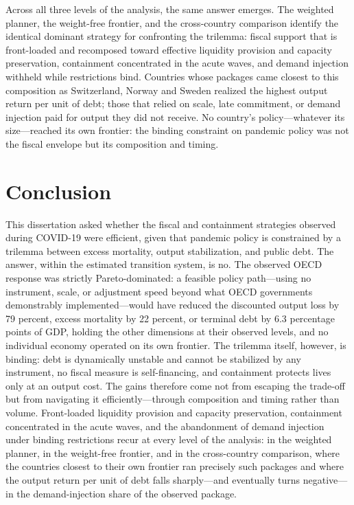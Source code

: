 \documentclass[12pt, a4paper]{article}
\begin{document}
Across all three levels of the analysis, the same answer emerges. The
weighted planner, the weight-free frontier, and the cross-country comparison
identify the identical dominant strategy for confronting the trilemma:
fiscal support that is front-loaded and recomposed toward effective
liquidity provision and capacity preservation, containment concentrated in the acute waves, and demand injection withheld while restrictions bind. Countries whose packages came
closest to this composition as Switzerland, Norway and Sweden realized the highest output return per unit of debt; those that relied on scale, late commitment, or demand injection paid
for output they did not receive. No country's policy---whatever its size---reached its own frontier: the binding constraint on pandemic policy was not the fiscal envelope but its composition and timing.


\section{Conclusion}
\label{sec:conclusion}


This dissertation asked whether the fiscal and containment strategies
observed during COVID-19 were efficient, given that pandemic policy is
constrained by a trilemma between excess mortality, output stabilization, and
public debt. The answer, within the estimated transition system, is no. The
observed OECD response was strictly Pareto-dominated: a feasible policy
path---using no instrument, scale, or adjustment speed beyond what OECD
governments demonstrably implemented---would have reduced the discounted
output loss by 79 percent, excess mortality by 22 percent, or terminal debt
by 6.3 percentage points of GDP, holding the other dimensions at their
observed levels, and no individual economy operated on its own frontier. The
trilemma itself, however, is binding: debt is dynamically unstable and cannot
be stabilized by any instrument, no fiscal measure is self-financing, and
containment protects lives only at an output cost. The gains therefore come
not from escaping the trade-off but from navigating it efficiently---through
composition and timing rather than volume. Front-loaded liquidity provision and capacity preservation, containment concentrated in the acute waves, and the abandonment of demand
injection under binding restrictions recur at every level of the analysis: in the weighted planner, in the weight-free frontier, and in the cross-country comparison, where the countries closest to their own frontier ran precisely such packages and where the output return per unit of debt
falls sharply---and eventually turns negative---in the demand-injection share of the observed package.
\end{document}
